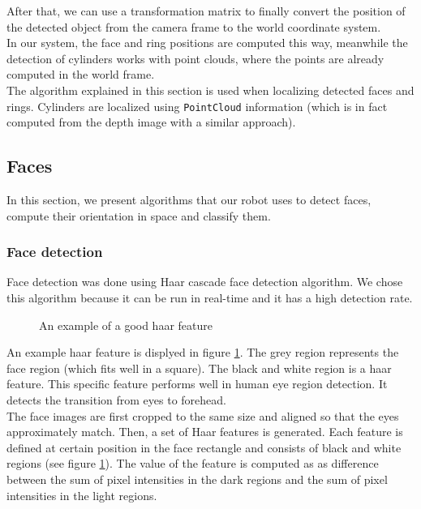 \documentclass[12pt,a4paper]{article}
\begin{document}
	After that, we can use a transformation matrix to finally convert the position of the detected object from the camera frame to the world coordinate system. \\ 
	
	In our system, the face and ring positions are computed this way, meanwhile the detection of cylinders works with point clouds, where the points are already computed in the world frame. \\
	
	The algorithm explained in this section is used when localizing detected faces and rings. Cylinders are localized using \texttt{PointCloud} information (which is in fact computed from the depth image with a similar approach). \\
	
	\subsection{Faces}
	In this section, we present algorithms that our robot uses to detect faces, compute their orientation in space and classify them.
	
	\subsubsection{Face detection} \label{face_detection_algorithm}
	
	Face detection was done using Haar cascade face detection algorithm. We chose this algorithm because it can be run in real-time and it has a high detection rate. \\
	
	\begin{figure}[h]
		\centering
		\caption{An example of a good haar feature}
		\label{fig:haar_features}
	\end{figure}

	An example haar feature is displyed in figure \ref{fig:haar_features}. The grey region represents the face region (which fits well in a square). The black and white region is a haar feature. This specific feature performs well in human eye region detection. It detects the transition from eyes to forehead. \\
	
	The face images are first cropped to the same size and aligned so that the eyes approximately match. Then, a set of Haar features is generated. Each feature is defined at certain position in the face rectangle and consists of black and white regions (see figure \ref{fig:haar_features}). The value of the feature is computed as as difference between the sum of pixel intensities in the dark regions and the sum of pixel intensities in the light regions. \\
	
\end{document}
